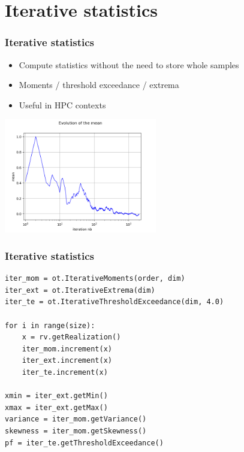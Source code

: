 \documentclass{beamer}
\begin{document}
\section{Iterative statistics}


\begin{frame}[containsverbatim]
\frametitle{Iterative statistics}

\begin{itemize}
\item Compute statistics without the need to store whole samples
\item Moments / threshold exceedance / extrema
\item Useful in HPC contexts
\end{itemize}

\begin{center}
\includegraphics[width=0.5\textwidth]{figures/sphx_glr_plot_iterative_moments_001.png}
\end{center}
\end{frame}

\begin{frame}[containsverbatim]
\frametitle{Iterative statistics}

\lstset{language=python}
\begin{lstlisting}
iter_mom = ot.IterativeMoments(order, dim)
iter_ext = ot.IterativeExtrema(dim)
iter_te = ot.IterativeThresholdExceedance(dim, 4.0)

for i in range(size):
    x = rv.getRealization()
    iter_mom.increment(x)
    iter_ext.increment(x)
    iter_te.increment(x)

xmin = iter_ext.getMin()
xmax = iter_ext.getMax()
variance = iter_mom.getVariance()
skewness = iter_mom.getSkewness()
pf = iter_te.getThresholdExceedance()
\end{lstlisting}


\end{frame}
\end{document}
